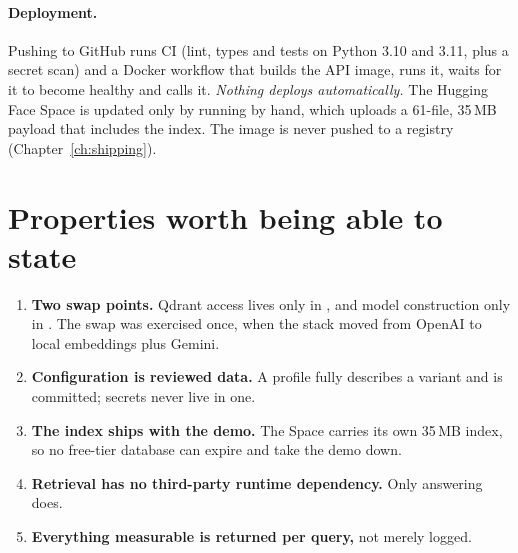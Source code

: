 \paragraph{Deployment.} Pushing to GitHub runs CI (lint, types and tests on Python 3.10 and 3.11, plus a secret scan) and a Docker workflow that builds the API image, runs it, waits for it to become healthy and calls it. \emph{Nothing deploys automatically.} The Hugging Face Space is updated only by running  by hand, which uploads a 61-file, 35\,MB payload that includes the index. The image is never pushed to a registry (Chapter~\ref{ch:shipping}).

\section{Properties worth being able to state}

\begin{enumerate}
  \item \textbf{Two swap points.} Qdrant access lives only in , and model construction only in . The swap was exercised once, when the stack moved from OpenAI to local embeddings plus Gemini.
  \item \textbf{Configuration is reviewed data.} A profile fully describes a variant and is committed; secrets never live in one.
  \item \textbf{The index ships with the demo.} The Space carries its own 35\,MB index, so no free-tier database can expire and take the demo down.
  \item \textbf{Retrieval has no third-party runtime dependency.} Only answering does.
  \item \textbf{Everything measurable is returned per query,} not merely logged.
\end{enumerate}
